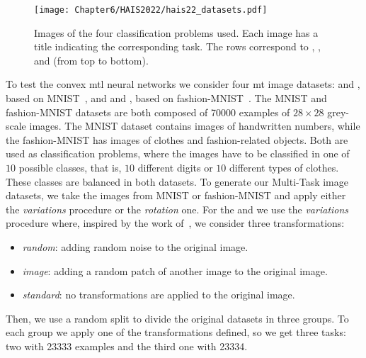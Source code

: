 \begin{figure}[t!]
    \texttt{[image: Chapter6/HAIS2022/hais22\_datasets.pdf]}
    \caption{Images of the four classification problems used. Each image has a title indicating the corresponding task. The rows correspond to , ,  and  (from top to bottom).}
    \label{fig:problems_hais2022}
\end{figure}

To test the convex \acrshort{mtl} neural networks we consider four \acrshort{mt} image datasets:
 and , based on MNIST~\citep{LeCunBBH98}, and  and , based on fashion-MNIST~\citep{xiao2017}.
%
The MNIST and fashion-MNIST datasets are both composed of \num{70000} examples of $28\times 28$ grey-scale images. The MNIST dataset contains images of handwritten numbers, while the fashion-MNIST has images of clothes and fashion-related objects.
Both are used as classification problems, where the images have to be classified in one of $10$ possible classes, that is, $10$ different digits or $10$ different types of clothes. These classes are balanced in both datasets.
%
To generate our Multi-Task image datasets, we take the images from MNIST or fashion-MNIST and apply either the \emph{variations} procedure or the \emph{rotation} one.
%
For the  and  we use the \emph{variations} procedure where, inspired by the work of~\cite{BergstraB12}, we consider three transformations:
\begin{itemize}
    \item \textit{random}: adding random noise to the original image.
    \item \textit{image}: adding a random patch of another image to the original image.
    \item \textit{standard}: no transformations are applied to the original image.
\end{itemize}
Then, we use a random split to divide the original datasets in three groups. To each group we apply one of the transformations defined, so we get three tasks: two with \num{23333} examples and the third one with \num{23334}.

